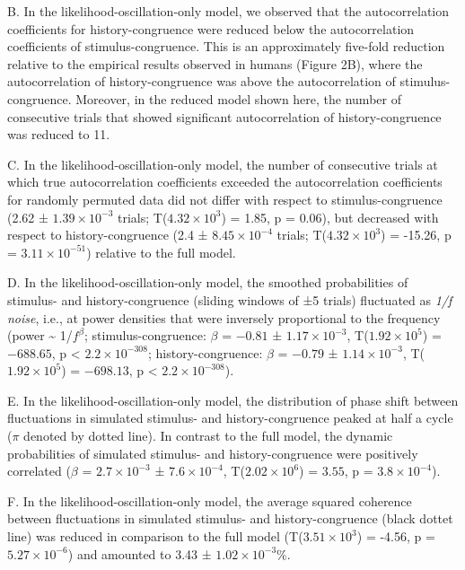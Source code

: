 \documentclass[
]{article}
\begin{document}
B. In the likelihood-oscillation-only model, we observed that the
autocorrelation coefficients for history-congruence were reduced below
the autocorrelation coefficients of stimulus-congruence. This is an
approximately five-fold reduction relative to the empirical results
observed in humans (Figure 2B), where the autocorrelation of
history-congruence was above the autocorrelation of stimulus-congruence.
Moreover, in the reduced model shown here, the number of consecutive
trials that showed significant autocorrelation of history-congruence was
reduced to 11.

C. In the likelihood-oscillation-only model, the number of consecutive
trials at which true autocorrelation coefficients exceeded the
autocorrelation coefficients for randomly permuted data did not differ
with respect to stimulus-congruence (2.62 ±
\ensuremath{1.39\times 10^{-3}} trials;
T(\ensuremath{4.32\times 10^{3}}) = 1.85, p = \(0.06\)), but decreased
with respect to history-congruence (2.4 ±
\ensuremath{8.45\times 10^{-4}} trials;
T(\ensuremath{4.32\times 10^{3}}) = -15.26, p =
\(\ensuremath{3.11\times 10^{-51}}\)) relative to the full model.

D. In the likelihood-oscillation-only model, the smoothed probabilities
of stimulus- and history-congruence (sliding windows of ±5 trials)
fluctuated as \emph{1/f noise}, i.e., at power densities that were
inversely proportional to the frequency (power \textasciitilde{}
1/\(f^\beta\); stimulus-congruence: \(\beta\) = \(-0.81\) ±
\(\ensuremath{1.17\times 10^{-3}}\),
T(\(\ensuremath{1.92\times 10^{5}}\)) = \(-688.65\), p < \(\ensuremath{2.2\times 10^{-308}}\);
history-congruence: \(\beta\) = \(-0.79\) ±
\(\ensuremath{1.14\times 10^{-3}}\),
T(\(\ensuremath{1.92\times 10^{5}}\)) = \(-698.13\), p < \(\ensuremath{2.2\times 10^{-308}}\)).

E. In the likelihood-oscillation-only model, the distribution of phase
shift between fluctuations in simulated stimulus- and history-congruence
peaked at half a cycle (\(\pi\) denoted by dotted line). In contrast to
the full model, the dynamic probabilities of simulated stimulus- and
history-congruence were positively correlated (\(\beta\) =
\(\ensuremath{2.7\times 10^{-3}}\) ± \(\ensuremath{7.6\times 10^{-4}}\),
T(\(\ensuremath{2.02\times 10^{6}}\)) = \(3.55\), p =
\(\ensuremath{3.8\times 10^{-4}}\)).

F. In the likelihood-oscillation-only model, the average squared
coherence between fluctuations in simulated stimulus- and
history-congruence (black dottet line) was reduced in comparison to the
full model (T(\ensuremath{3.51\times 10^{3}}) = -4.56, p =
\(\ensuremath{5.27\times 10^{-6}}\)) and amounted to 3.43 ±
\ensuremath{1.02\times 10^{-3}}\%.
\end{document}
